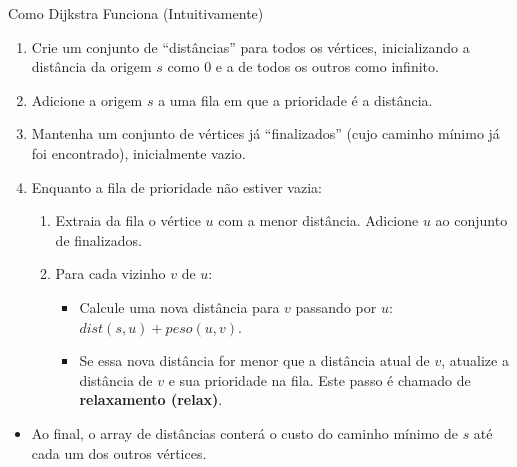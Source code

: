 \documentclass[xcolor=table]{beamer}
\begin{document}
\begin{frame}{Como Dijkstra Funciona (Intuitivamente)}
  \begin{enumerate}
    \item Crie um conjunto de ``distâncias'' para todos os vértices, inicializando a distância da origem $s$ como 0 e a de todos os outros como infinito.
    \item Adicione a origem $s$ a uma fila em que a prioridade é a distância.
    \item Mantenha um conjunto de vértices já ``finalizados'' (cujo caminho mínimo já foi encontrado), inicialmente vazio.
    \item Enquanto a fila de prioridade não estiver vazia:
    \begin{enumerate}
      \item Extraia da fila o vértice $u$ com a menor distância. Adicione $u$ ao conjunto de finalizados.
      \item Para cada vizinho $v$ de $u$:
      \begin{itemize}
        \item Calcule uma nova distância para $v$ passando por $u$: $dist(s,u) + peso(u,v)$.
        \item Se essa nova distância for menor que a distância atual de $v$, atualize a distância de $v$ e sua prioridade na fila. Este passo é chamado de \textbf{relaxamento (relax)}.
      \end{itemize}
    \end{enumerate}
  \end{enumerate}
  \begin{itemize}
    \item Ao final, o array de distâncias conterá o custo do caminho mínimo de $s$ até cada um dos outros vértices.
  \end{itemize}
\end{frame}
\end{document}
